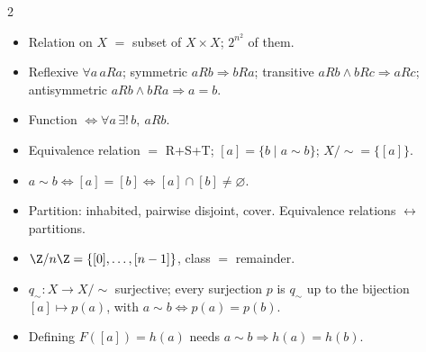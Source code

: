 
\begin{multicols}{2}\small
\begin{itemize}
\item Relation on $X$ $=$ subset of $X\times X$; $2^{n^2}$ of them.
\item Reflexive $\forall a\,aRa$; symmetric $aRb\Rightarrow bRa$; transitive $aRb\wedge bRc\Rightarrow aRc$; antisymmetric $aRb\wedge bRa\Rightarrow a=b$.
\item Function $\Leftrightarrow\forall a\,\exists!\,b,\ aRb$.
\item Equivalence relation $=$ R+S+T; $[a]=\{b\mid a\sim b\}$; $X/{\sim}=\{[a]\}$.
\item $a\sim b\Leftrightarrow[a]=[b]\Leftrightarrow[a]\cap[b]\neq\varnothing$.
\item Partition: inhabited, pairwise disjoint, cover. Equivalence relations $\leftrightarrow$ partitions.
\item $\Z/n\Z=\{[0],\dots,[n-1]\}$, class $=$ remainder.
\item $q_\sim:X\to X/{\sim}$ surjective; every surjection $p$ is $q_\sim$ up to the bijection $[a]\mapsto p(a)$, with $a\sim b\Leftrightarrow p(a)=p(b)$.
\item Defining $F([a])=h(a)$ needs $a\sim b\Rightarrow h(a)=h(b)$.
\end{itemize}
\end{multicols}
